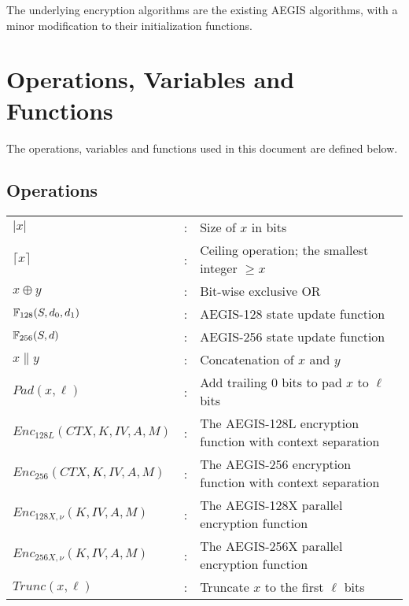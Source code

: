 \documentclass[envcountsame,runningheads,notitlepage]{llncs}
\begin{document}
The underlying encryption algorithms are the existing AEGIS algorithms, with a minor modification to their initialization functions.

\section{Operations, Variables and Functions}
\label{sec:notation}

The operations, variables and functions used in this document are defined below.

\subsection{Operations}

\begin{tabular}{l c p{}}
  $\lvert x \rvert$              & : & Size of $x$ in bits                                        \\
  $\lceil x \rceil$              & : & Ceiling operation; the smallest integer $\geq x$           \\
  $x \oplus y$                   & : & Bit-wise exclusive OR                                      \\
  $\mathbb{F}_{128}(S, d_0, d_1)$        & : & AEGIS-128 state update function                            \\
  $\mathbb{F}_{256}(S, d)$               & : & AEGIS-256 state update function                            \\
  $x \| y$                       & : & Concatenation of $x$ and $y$                               \\
  $Pad(x,\ell)$                  & : & Add trailing $0$ bits to pad $x$ to $\ell$ bits            \\
  $Enc_{128L}(CTX, K, IV, A, M)$ & : & The AEGIS-128L encryption function with context separation \\
  $Enc_{256}(CTX, K, IV, A, M)$  & : & The AEGIS-256 encryption function with context separation  \\
  $Enc_{128X,\nu}(K, IV, A, M)$  & : & The AEGIS-128X parallel encryption function                \\
  $Enc_{256X,\nu}(K, IV, A, M)$  & : & The AEGIS-256X parallel encryption function                \\
  $Trunc(x, \ell)$               & : & Truncate $x$ to the first $\ell$ bits                      \\
\end{tabular}
\end{document}
